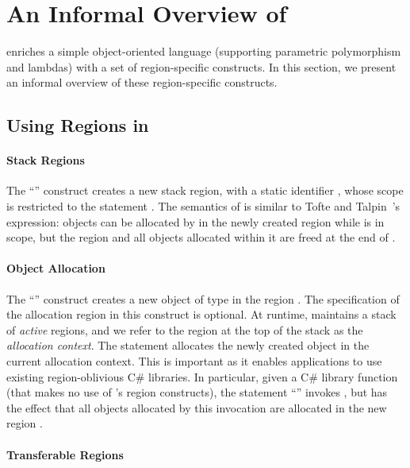\newcommand{\COMMENT}[1]{}

\section{An Informal Overview of \name} \label{sec:overview}

\name enriches a simple object-oriented language (supporting
parametric polymorphism and lambdas) with a set of region-specific
constructs.  In this section, we present an informal overview of these
region-specific constructs.

\subsection{Using Regions in \name}
\label{sec:alloc-ctxt}

\paragraph{Stack Regions} The ``'' construct
creates a new stack region, with a static identifier , whose
scope is restricted to the statement . The semantics of
 is similar to Tofte and Talpin~\cite{tofte94}'s
 expression: objects can be allocated by  in the
newly created region while  is in scope, but the region and all
objects allocated within it are freed at the end of .

\paragraph{Object Allocation} The ``'' construct creates
a new object of type  in the region . The specification of
the allocation region  in this construct is optional.  At
runtime, \name maintains a stack of \emph{active} regions, and we
refer to the region at the top of the stack as the \emph{allocation
context}. The statement  allocates the newly created object
in the current allocation context.
%
This is important as it enables \name applications to use existing
region-oblivious C\# libraries. In particular, given a  C\# library
function  (that makes no use of \name's region constructs), the
statement ``'' invokes , but has the
effect that all objects allocated by this invocation are allocated in
the new region .

\paragraph{Transferable Regions} 

